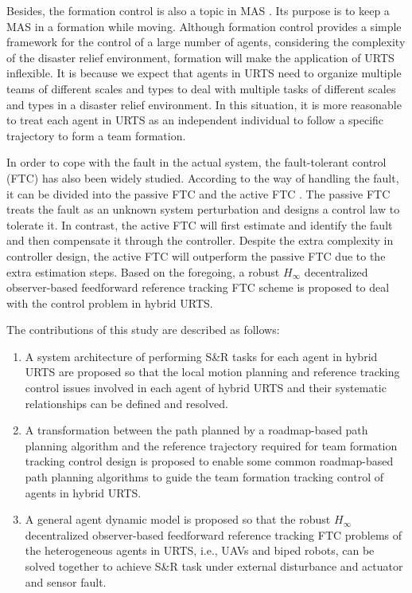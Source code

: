 \documentclass[journal,12pt,onecolumn,draftclsnofoot,]{IEEEtran}
\begin{document}
Besides, the formation control is also a topic in MAS \cite{wang2022consensus}. Its purpose is to keep a MAS in a formation while moving. Although formation control provides a simple framework for the control of a large number of agents, considering the complexity of the disaster relief environment, formation will make the application of URTS inflexible. It is because we expect that agents in URTS need to organize multiple teams of different scales and types to deal with multiple tasks of different scales and types in a disaster relief environment. In this situation, it is more reasonable to treat each agent in URTS as an independent individual to follow a specific trajectory to form a team formation.

In order to cope with the fault in the actual system, the fault-tolerant control (FTC) has also been widely studied. According to the way of handling the fault, it can be divided into the passive FTC and the active FTC \cite{6669235}. The passive FTC treats the fault as an unknown system perturbation and designs a control law to tolerate it. In contrast, the active FTC will first estimate and identify the fault and then compensate it through the controller. Despite the extra complexity in controller design, the active FTC will outperform the passive FTC due to the extra estimation steps. Based on the foregoing, a robust $H_\infty$ decentralized observer-based feedforward reference tracking FTC scheme is proposed to deal with the control problem in hybrid URTS.

The contributions of this study are described as follows:
\begin{enumerate}
    \item A system architecture of performing S\&R tasks for each agent in hybrid URTS are proposed so that the local motion planning and reference tracking control issues involved in each agent of hybrid URTS and their systematic relationships can be defined and resolved.
    \item A transformation between the path planned by a roadmap-based path planning algorithm and the reference trajectory required for team formation tracking control design is proposed to enable some common roadmap-based path planning algorithms to guide the team formation tracking control of agents in hybrid URTS.
    \item A general agent dynamic model is proposed so that the robust $H_\infty$ decentralized observer-based feedforward reference tracking FTC problems of the heterogeneous agents in URTS, i.e., UAVs and biped robots, can be solved together to achieve S\&R task under external disturbance and actuator and sensor fault.
\end{enumerate}
\end{document}
